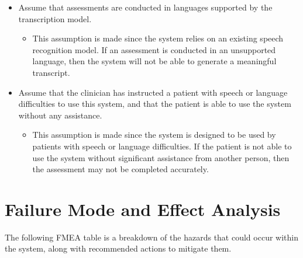 \documentclass{article}
\begin{document}
\begin{itemize}
\begin{itemize}
    \end{itemize}
    \item Assume that assessments are conducted in languages supported by the transcription model.
    \begin{itemize}
        \item This assumption is made since the system relies on an existing speech recognition model. If an assessment is conducted in an unsupported language, then the system will not be able to generate a meaningful transcript.
    \end{itemize}
    \item Assume that the clinician has instructed a patient with speech or language difficulties to use this system, and that the patient is able to use the system without any assistance.
    \begin{itemize}
        \item This assumption is made since the system is designed to be used by patients with speech or language difficulties. If the patient is not able to use the system without significant assistance from another person, then the assessment may not be completed accurately.
    \end{itemize}
\end{itemize}


\section{Failure Mode and Effect Analysis} \label{sec:FMEASection}





The following FMEA table is a breakdown of the hazards that could occur within the system, along with recommended actions to mitigate them.
\end{document}
